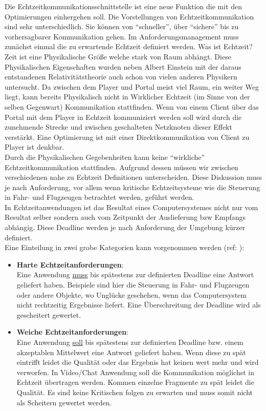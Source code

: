 Die Echtzeitkommunikationsschnittstelle ist eine neue Funktion die mit den Optimierungen einhergehen soll. Die Vorstellungen von Echtzeitkommunikation sind sehr unterschiedlich. Sie können von "`schneller"', über "`sichere"' bis zu vorhersagbarer Kommunikation gehen. 
Im Anforderungsmanagement muss zunächst einmal die zu erwartende Echtzeit definiert werden. Was ist Echtzeit? Zeit ist eine Physikalische Größe welche stark von Raum abhängt. Diese Physikalischen Eigenschaften wurden neben Albert Einstein mit der daraus entstandenen Relativitätstheorie auch schon von vielen anderen Physikern untersucht. Da zwischen dem Player und Portal meist viel Raum, ein weiter Weg liegt, kann bereits Physikalisch nicht in Wirklicher Echtzeit (im Sinne von der selben Gegenwart) Kommunikation stattfinden. Wenn von einem Client über das Portal mit dem Player in Echtzeit kommuniziert werden soll wird durch die zunehmende Strecke und zwischen geschalteten Netzknoten dieser Effekt verstärkt. Eine Optimierung ist mit einer Direktkommunikation von Client zu Player ist denkbar.
\\Durch die Physikalischen Gegebenheiten kann keine "`wirkliche"' Echtzeitkommunikation stattfinden. Aufgrund dessen müssen wir zwischen verschiedenen nahe zu Echtzeit Definitionen unterscheiden. Diese Diskussion muss je nach Anforderung, vor allem wenn kritische Echtzeitsysteme wie die Steuerung in Fahr- und Flugzeugen betrachtet werden, geführt werden. 
\\In Echtzeitanwendungen ist das Resultat eines Computersystemes nicht nur vom Resultat selber sondern auch vom Zeitpunkt der Auslieferung bzw Empfangs abhängig. 
Diese Deadline werden je nach Anforderung der Umgebung kürzer definiert.
\\Eine Einteilung in zwei grobe Kategorien kann vorgenommen werden (ref: \cite{Echtzeitsysteme Grundlagen}):

\begin{itemize}
\item \textbf{Harte Echtzeitanforderungen}: \\Eine Anwendung \underline{muss} bis spätestens zur definierten Deadline eine Antwort geliefert haben. Beispiele sind hier die Steuerung in Fahr- und Flugzeugen oder andere Objekte, wo Unglücke geschehen, wenn das Computersystem nicht rechtzeitig Ergebnisse liefert. Eine Überschreitung der Deadline wird als gescheitert gewertet. 

\item \textbf{Weiche Echtzeitanforderungen}: \\Eine Anwendung \underline{soll} bis spätestens zur definierten Deadline bzw. einem akzeptablen Mittelwert eine Antwort geliefert haben. Wenn diese zu spät eintrifft leidet die Qualität oder das Ergebnis hat keinen wert mehr und wird verworfen. In Video/Chat Anwendung soll die Kommunikation möglichst in Echtzeit übertragen werden. Kommen einzelne Fragmente zu spät leidet die Qualität. Es sind keine Kritischen folgen zu erwarten und muss somit nicht als Scheitern gewertet werden.
\end{itemize}

